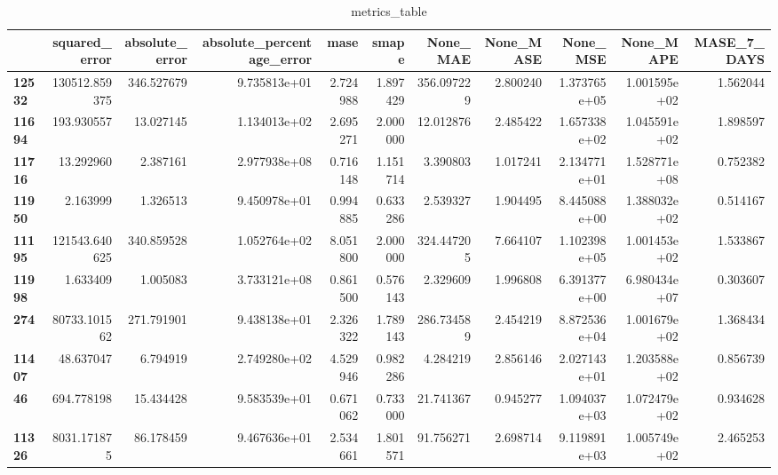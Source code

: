 \begin{table}[h]
\centering
\caption{metrics_table}
\label{table:Experiment with CNN AE and LSTM hybrid method. Global, multivariate, dataset 2. Tuned with LSTM Global Multivariate dataset 2}
\begin{tabular}{lrrrrrrrrrr}
\toprule
{} &  squared\_error &  absolute\_error &  absolute\_percentage\_error &      mase &     smape &     None\_MAE &  None\_MASE &      None\_MSE &     None\_MAPE &  MASE\_7\_DAYS \\
\midrule
\textbf{12532} &  130512.859375 &      346.527679 &               9.735813e+01 &  2.724988 &  1.897429 &   356.097229 &   2.800240 &  1.373765e+05 &  1.001595e+02 &     1.562044 \\
\textbf{11694} &     193.930557 &       13.027145 &               1.134013e+02 &  2.695271 &  2.000000 &    12.012876 &   2.485422 &  1.657338e+02 &  1.045591e+02 &     1.898597 \\
\textbf{11716} &      13.292960 &        2.387161 &               2.977938e+08 &  0.716148 &  1.151714 &     3.390803 &   1.017241 &  2.134771e+01 &  1.528771e+08 &     0.752382 \\
\textbf{11950} &       2.163999 &        1.326513 &               9.450978e+01 &  0.994885 &  0.633286 &     2.539327 &   1.904495 &  8.445088e+00 &  1.388032e+02 &     0.514167 \\
\textbf{11195} &  121543.640625 &      340.859528 &               1.052764e+02 &  8.051800 &  2.000000 &   324.447205 &   7.664107 &  1.102398e+05 &  1.001453e+02 &     1.533867 \\
\textbf{11998} &       1.633409 &        1.005083 &               3.733121e+08 &  0.861500 &  0.576143 &     2.329609 &   1.996808 &  6.391377e+00 &  6.980434e+07 &     0.303607 \\
\textbf{274  } &   80733.101562 &      271.791901 &               9.438138e+01 &  2.326322 &  1.789143 &   286.734589 &   2.454219 &  8.872536e+04 &  1.001679e+02 &     1.368434 \\
\textbf{11407} &      48.637047 &        6.794919 &               2.749280e+02 &  4.529946 &  0.982286 &     4.284219 &   2.856146 &  2.027143e+01 &  1.203588e+02 &     0.856739 \\
\textbf{46   } &     694.778198 &       15.434428 &               9.583539e+01 &  0.671062 &  0.733000 &    21.741367 &   0.945277 &  1.094037e+03 &  1.072479e+02 &     0.934628 \\
\textbf{11326} &    8031.171875 &       86.178459 &               9.467636e+01 &  2.534661 &  1.801571 &    91.756271 &   2.698714 &  9.119891e+03 &  1.005749e+02 &     2.465253 \\

\end{tabular}
\end{table}
